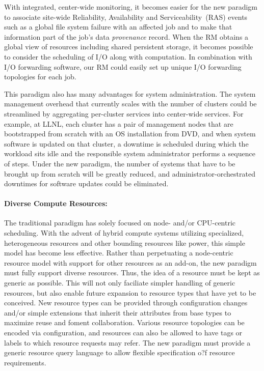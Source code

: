 \documentclass{article}
\begin{document}
With integrated, center-wide monitoring, it becomes easier
for the new paradigm to associate site-wide Reliability, Availability and Serviceability~(RAS) 
events such as a global file system
failure with an affected job and to make that information part of
the job's data {\em provenance} record. When the RM obtains a global view of
resources including shared persistent storage, it becomes possible to
consider the scheduling of I/O along with computation. In combination with
I/O forwarding software, our RM could easily set up unique I/O forwarding
topologies for each job.

This paradigm also has many advantages for system administration.
The system management overhead that currently scales with the number of clusters
could be streamlined by aggregating per-cluster services into center-wide
services. For example, at LLNL, each cluster has a pair of management
nodes that are bootstrapped from scratch with an OS installation from DVD,
and when system software is updated on that cluster, a downtime is
scheduled during which the workload sits idle and the responsible system
administrator performs a sequence of steps. Under the new paradigm, the
number of systems that have to be brought up from scratch will be
greatly reduced, and administrator-orchestrated downtimes for software
updates could be eliminated. 


\paragraph{Diverse Compute Resources:}
The traditional paradigm has solely focused on node- and/or CPU-centric
scheduling. With the advent of hybrid compute systems utilizing specialized,
heterogeneous resources and other bounding resources like power, 
this simple model has become less effective. Rather than
perpetuating a node-centric resource model with support for other
resources as an add-on, the new paradigm must fully support diverse resources. 
Thus, the idea of a resource must be kept as generic as
possible. This will not only faciliate simpler handling of generic resources,
but also enable future expansion to resource types that have yet to
be conceived. New resource types can be provided through configuration changes
and/or simple extensions that inherit their attributes from base types 
to maximize reuse and foment collaboration.  Various resource topologies
can be encoded via configuration, and resources can also be allowed to have tags or labels
to which resource requests may refer. 
The new paradigm must provide a generic resource query language to allow flexible
specification o?f resource requirements.
\end{document}
